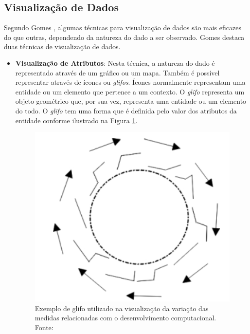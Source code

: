 \subsection{Visualização de Dados}
Segundo Gomes \cite{gomes_percepcao_2011}, algumas técnicas para visualização de dados são mais eficazes do que outras, dependendo da natureza do dado a ser observado. Gomes destaca duas técnicas de visualização de dados.

\begin{itemize}
\item \textbf{Visualização de Atributos}: Nesta técnica, a natureza do dado é representado através de um gráfico ou um mapa. Também é possível representar através de ícones ou \textit{glifos}. Ícones normalmente representam uma entidade ou um elemento que pertence a um contexto. O \textit{glifo} representa um objeto geométrico que, por sua vez, representa uma entidade ou um elemento do todo. O \textit{glifo} tem uma forma que é definida pelo valor dos atributos da entidade conforme ilustrado na Figura \ref{img:glifo}.
\graphicspath{{figuras/}}
\begin{figure}[h!]
\centering
\includegraphics[scale=0.5]{Glifo}
\caption{Exemplo de glifo utilizado na visualização da variação das medidas relacionadas com o desenvolvimento computacional. Fonte: \cite{gomes_percepcao_2011}}
\label{img:glifo}
\end{figure}


\end{itemize}
